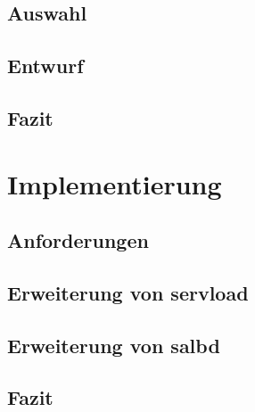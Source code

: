 \documentclass[a4paper, 11pt, toc=bibliography, toc=listof]{scrbook}
\begin{document}

		\section{Auswahl} %
		\label{sec:Auswahl}
		

		\section{Entwurf} %
		\label{sec:Entwurf}
		

		\section{Fazit} %
		\label{sec:Fazit}
		


	\chapter{Implementierung} %
	\label{cha:Implementierung}
		
		\section{Anforderungen} %
		\label{sec:Anforderungen}
			

		\section{Erweiterung von servload} %
		\label{sec:Erweiterung von servload}
			

		\section{Erweiterung von salbd} %
		\label{sec:Erweiterung von salbd}
			

		\section{Fazit} %
		\label{sec:Fazit}
		
\end{document}
